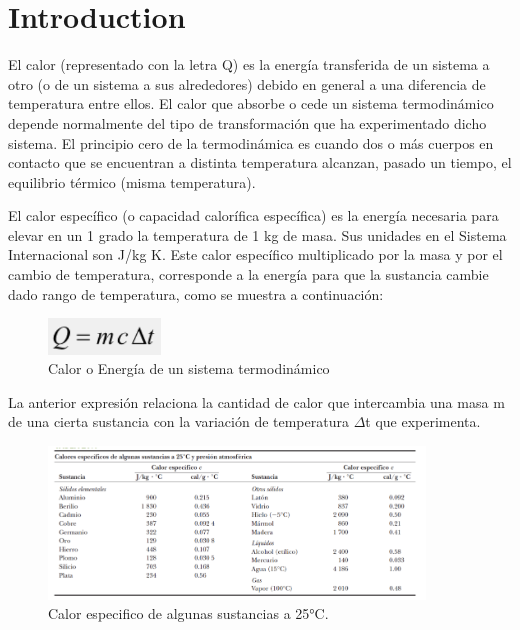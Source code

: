 \documentclass[journal,transmag]{IEEEtran}
\begin{document}
\section{Introduction}
	
	El calor (representado con la letra Q) es la energía transferida de un sistema a otro (o de un sistema a sus alrededores) debido en general a una diferencia de temperatura entre ellos. El calor que absorbe o cede un sistema termodinámico depende normalmente del tipo de transformación que ha experimentado dicho sistema.
El principio cero de la termodinámica es cuando dos o más cuerpos en contacto que se encuentran a distinta temperatura alcanzan, pasado un tiempo, el equilibrio térmico (misma temperatura).

El calor específico (o capacidad calorífica específica) es la energía necesaria para elevar en un 1 grado la temperatura de 1 kg de masa. Sus unidades en el Sistema Internacional son J/kg K. Este calor específico multiplicado por la masa y por el cambio de temperatura, corresponde a la energía para que la sustancia cambie dado rango de temperatura, como se muestra a continuación:
 \begin{figure}[!h]
			\center
			\includegraphics[width=3cm]{img/eq1.png}
			\caption{Calor o Energía de un sistema termodinámico}
			\label{f1}
\end{figure}

La anterior expresión relaciona la cantidad de calor que intercambia una masa m de una cierta sustancia con la variación de temperatura $\Delta$t que experimenta.  

\begin{figure}[!h]
			\center
			\includegraphics[width=10cm]{img/fig1.png}
			\caption{Calor especifico de algunas sustancias a 25°C.}
			\label{f1}
		\end{figure}
\end{document}
